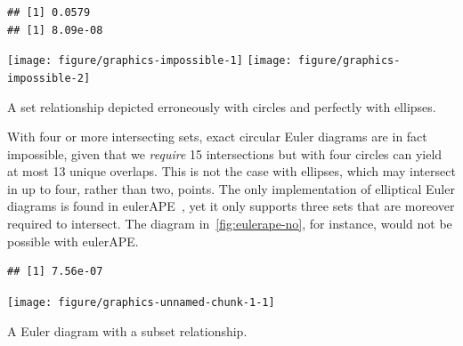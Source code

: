 \documentclass[
  oneside,
  openany,
  numbers=noendperiod,
  parskip=half,
  bibliography=totoc
]{scrbook}\usepackage[]{graphicx}\usepackage{xcolor}
\makeatletter
\newenvironment{kframe}{%
 \def\at@end@of@kframe{}%
 \ifinner\ifhmode%
  \def\at@end@of@kframe{\end{minipage}}%
  \begin{minipage}{\columnwidth}%
 \fi\fi%
 \def\FrameCommand##1{\hskip\@totalleftmargin \hskip-\fboxsep
 \colorbox{shadecolor}{##1}\hskip-\fboxsep
     \hskip-\linewidth \hskip-\@totalleftmargin \hskip\columnwidth}%
 \MakeFramed {\advance\hsize-\width
   \@totalleftmargin\z@ \linewidth\hsize
   \@setminipage}}%
 {\par\unskip\endMakeFramed%
 \at@end@of@kframe}
\newenvironment{knitrout}{}{} %
\newcommand{\pkg}[1]{{\fontseries{b}\selectfont #1}}
\makeatother
\begin{document}
\begin{marginfigure}
\begin{knitrout}\small
{}\color{fgcolor}\begin{kframe}
\begin{verbatim}
## [1] 0.0579
## [1] 8.09e-08
\end{verbatim}
\end{kframe}

{\centering \texttt{[image: figure/graphics-impossible-1]} 
\texttt{[image: figure/graphics-impossible-2]} 

}



\end{knitrout}
\caption{A set relationship depicted erroneously with circles and perfectly with
  ellipses.}
\label{fig:impossible}
\end{marginfigure}

With four or more intersecting sets, exact circular Euler diagrams are in fact
impossible, given that we \emph{require} 15 intersections but with four circles
can yield at most 13 unique overlaps. This is not the case with ellipses, which
may intersect in up to four, rather than two, points. The only implementation of
elliptical Euler diagrams is found in \pkg{eulerAPE}~\citep{micallef_2014}, yet
it only supports three sets that are moreover required to intersect. The
diagram in~\cref{fig:eulerape-no}, for instance, would not be possible
with \pkg{eulerAPE}.

\begin{marginfigure}
\begin{knitrout}\small
{}\color{fgcolor}\begin{kframe}
\begin{verbatim}
## [1] 7.56e-07
\end{verbatim}
\end{kframe}

{\centering \texttt{[image: figure/graphics-unnamed-chunk-1-1]} 

}



\end{knitrout}
\caption{A Euler diagram with a subset relationship.}
\label{fig:eulerape-no}
\end{marginfigure}
\end{document}

